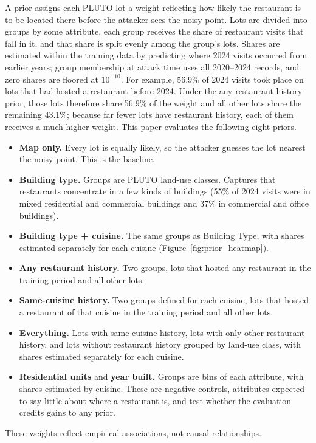 \documentclass[11pt]{article}
\begin{document}
A prior assigns each PLUTO lot a weight reflecting how likely the restaurant is to be located there before the attacker sees the noisy point. Lots are divided into groups by some attribute, each group receives the share of restaurant visits that fall in it, and that share is split evenly among the group's lots. Shares are estimated within the training data by predicting where 2024 visits occurred from earlier years; group membership at attack time uses all 2020--2024 records, and zero shares are floored at $10^{-10}$. For example, 56.9\% of 2024 visits took place on lots that had hosted a restaurant before 2024. Under the any-restaurant-history prior, those lots therefore share 56.9\% of the weight and all other lots share the remaining 43.1\%; because far fewer lots have restaurant history, each of them receives a much higher weight. This paper evaluates the following eight priors.
\begin{itemize}[leftmargin=1.5em]
    \item \textbf{Map only.} Every lot is equally likely, so the attacker guesses the lot nearest the noisy point. This is the baseline.
    \item \textbf{Building type.} Groups are PLUTO land-use classes. Captures that restaurants concentrate in a few kinds of buildings (55\% of 2024 visits were in mixed residential and commercial buildings and 37\% in commercial and office buildings).
    \item \textbf{Building type + cuisine.} The same groups as Building Type, with shares estimated separately for each cuisine (Figure~\ref{fig:prior_heatmap}).
    \item \textbf{Any restaurant history.} Two groups, lots that hosted any restaurant in the training period and all other lots.
    \item \textbf{Same-cuisine history.} Two groups defined for each cuisine, lots that hosted a restaurant of that cuisine in the training period and all other lots.
    \item \textbf{Everything.} Lots with same-cuisine history, lots with only other restaurant history, and lots without restaurant history grouped by land-use class, with shares estimated separately for each cuisine.
    \item \textbf{Residential units} and \textbf{year built.} Groups are bins of each attribute, with shares estimated by cuisine. These are negative controls, attributes expected to say little about where a restaurant is, and test whether the evaluation credits gains to any prior.
\end{itemize}
These weights reflect empirical associations, not causal relationships.
\end{document}
